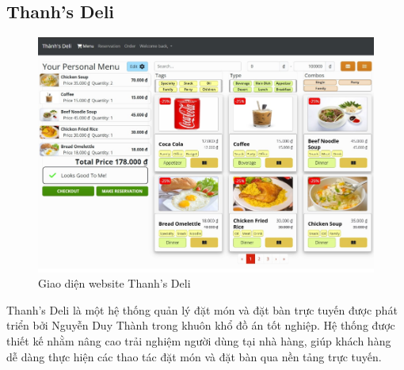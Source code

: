 \subsection{Thanh's Deli}

\begin{figure}[H]
    \centering
    \includegraphics[width=15cm]{Images/thanhsdeli.png}
    \vspace{0.5cm}
    \caption{Giao diện website Thanh's Deli}
    \label{fig:my_label}
\end{figure}

Thanh's Deli là một hệ thống quản lý đặt món và đặt bàn trực tuyến được phát triển bởi Nguyễn Duy Thành trong khuôn khổ đồ án tốt nghiệp. Hệ thống được thiết kế nhằm nâng cao trải nghiệm người dùng tại nhà hàng, giúp khách hàng dễ dàng thực hiện các thao tác đặt món và đặt bàn qua nền tảng trực tuyến.


